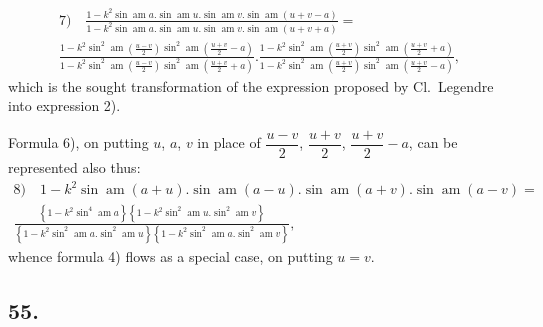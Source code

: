 \documentclass{article}
\begin{document}
\[
\begin{gathered}
\text{7)}\quad \frac{1-k^{2}\sin\operatorname{am}a.\sin\operatorname{am}u.\sin\operatorname{am}v.\sin\operatorname{am}(u+v-a)}{1-k^{2}\sin\operatorname{am}a.\sin\operatorname{am}u.\sin\operatorname{am}v.\sin\operatorname{am}(u+v+a)}=\\[1.5ex]
\frac{1-k^{2}\sin^{2}\operatorname{am}\left(\frac{u-v}{2}\right)\sin^{2}\operatorname{am}\left(\frac{u+v}{2}-a\right)}{1-k^{2}\sin^{2}\operatorname{am}\left(\frac{u-v}{2}\right)\sin^{2}\operatorname{am}\left(\frac{u+v}{2}+a\right)}.\frac{1-k^{2}\sin^{2}\operatorname{am}\left(\frac{u+v}{2}\right)\sin^{2}\operatorname{am}\left(\frac{u+v}{2}+a\right)}{1-k^{2}\sin^{2}\operatorname{am}\left(\frac{u+v}{2}\right)\sin^{2}\operatorname{am}\left(\frac{u+v}{2}-a\right)},
\end{gathered}
\]
which is the sought transformation of the expression proposed by Cl.\ Legendre into expression 2).

Formula 6), on putting $u$, $a$, $v$ in place of $\dfrac{u-v}{2}$, $\dfrac{u+v}{2}$, $\dfrac{u+v}{2}-a$, can be represented also thus:
\[
\begin{gathered}
\text{8)}\quad 1-k^{2}\sin\operatorname{am}(a+u).\sin\operatorname{am}(a-u).\sin\operatorname{am}(a+v).\sin\operatorname{am}(a-v)=\\[1.5ex]
\frac{\left\{1-k^{2}\sin^{4}\operatorname{am}a\right\}\left\{1-k^{2}\sin^{2}\operatorname{am}u.\sin^{2}\operatorname{am}v\right\}}{\left\{1-k^{2}\sin^{2}\operatorname{am}a.\sin^{2}\operatorname{am}u\right\}\left\{1-k^{2}\sin^{2}\operatorname{am}a.\sin^{2}\operatorname{am}v\right\}},
\end{gathered}
\]
whence formula 4) flows as a special case, on putting $u=v$.

\subsection*{55.}
\end{document}
